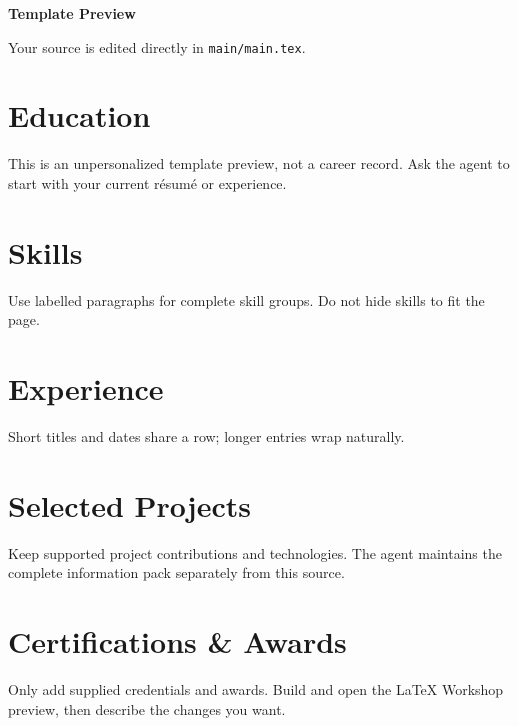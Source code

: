 \documentclass[10pt,letterpaper]{article}
\begin{document}
\begin{header}
    {\fontsize{20pt}{20pt}\selectfont\textbf{Template Preview}}\par
    \normalsize Your source is edited directly in \texttt{main/main.tex}.
\end{header}

\section{Education}
This is an unpersonalized template preview, not a career record. Ask the agent to start with your current r\'{e}sum\'{e} or experience.

\section{Skills}
Use labelled paragraphs for complete skill groups. Do not hide skills to fit the page.

\section{Experience}
Short titles and dates share a row; longer entries wrap naturally.

\section{Selected Projects}
Keep supported project contributions and technologies. The agent maintains the complete information pack separately from this source.

\section{Certifications \& Awards}
Only add supplied credentials and awards. Build and open the LaTeX Workshop preview, then describe the changes you want.
\end{document}
